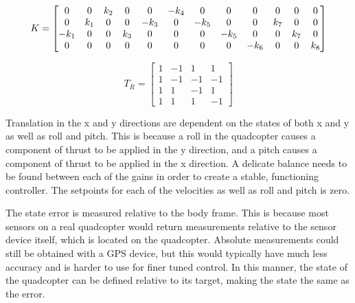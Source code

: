 \documentclass[letterpaper,12pt,titlepage,oneside,final]{book}
\begin{document}
\begin{equation} \label{eq:gain_matrix}
K =
\setcounter{MaxMatrixCols}{12}
\begin{bmatrix}
0 & 0 & k_{2} & 0 & 0 & -k_{4} & 0 & 0 & 0 & 0 & 0 & 0 \\
0 & k_{1} & 0 & 0 & -k_{3} & 0 & -k_{5} & 0 & 0 & k_{7} & 0 & 0 \\
-k_{1} & 0 & 0 & k_{3} & 0 & 0 & 0 & -k_{5} & 0 & 0 & k_{7} & 0 \\
0 & 0 & 0 & 0 & 0 & 0 & 0 & 0 & -k_{6} & 0 & 0 & k_{8}
\end{bmatrix}
\end{equation}

\begin{equation} \label{eq:rotor_transform}
T_{R} = 
\begin{bmatrix}
1 & -1 & 1 & 1 \\
1 & -1 & -1 & -1 \\
1 & 1 & -1 & 1 \\
1 & 1 & 1 & -1
\end{bmatrix}
\end{equation}

Translation in the x and y directions are dependent on the states of both x and y as well as roll and pitch. 
This is because a roll in the quadcopter causes a component of thrust to be applied in the y direction, and a pitch causes a component of thrust to be applied in the x direction.
A delicate balance needs to be found between each of the gains in order to create a stable, functioning controller. 
The setpoints for each of the velocities as well as roll and pitch is zero.


The state error is measured relative to the body frame. This is because most sensors on a real quadcopter would return measurements relative to the sensor device itself, which is located on the quadcopter. Absolute measurements could still be obtained with a GPS device, but this would typically have much less accuracy and is harder to use for finer tuned control. In this manner, the state of the quadcopter can be defined relative to its target, making the state the same as the error.
\end{document}
